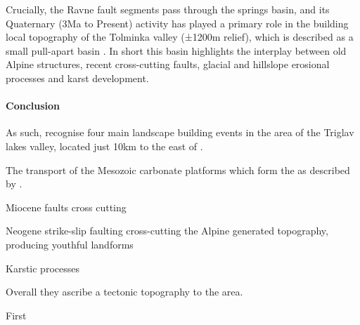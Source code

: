 Crucially, the Ravne fault segments pass through the  springs basin, and its Quaternary (3Ma to Present) activity has played a primary role in the building local topography of the Tolminka valley (±1200m relief), which is described as a small pull-apart basin \citet{cunningham2006application}. 
In short this basin highlights the interplay between old Alpine structures, recent cross-cutting faults, glacial and hillslope erosional processes and karst development.

\paragraph{Conclusion}
\label{par:Conclusion}
As such, \citet{vsmuc2009tectonic} recognise four main landscape building events in the area of the Triglav lakes valley, located just 10km to the east of .

\begin{citemize}
\item The transport of the Mesozoic carbonate platforms which form the  as described by \citet{placer1998contribution}.
\item Miocene faults cross cutting 
\item Neogene strike-slip faulting cross-cutting the Alpine generated topography, producing youthful landforms \citep{vsmuc2009tectonic,cunningham2006application}
\item Karstic processes \citep{}
\end{citemize}
Overall they ascribe a tectonic topography to the area.

First 

